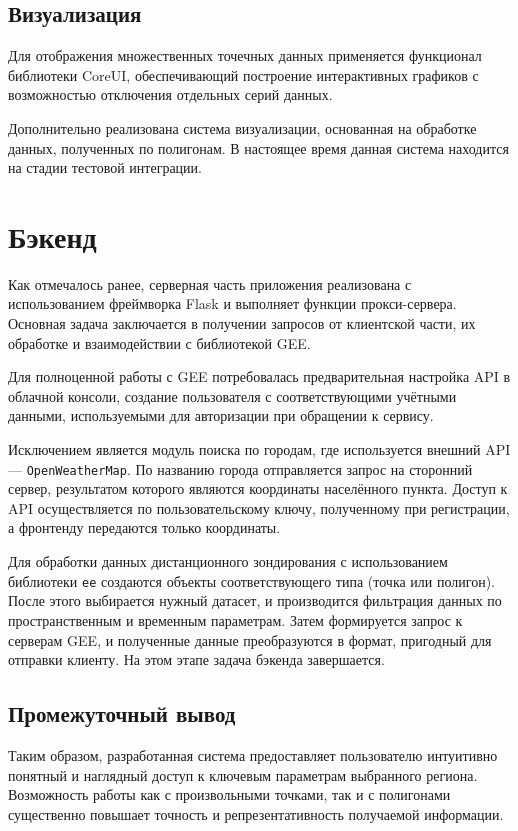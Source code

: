 \subsection*{Визуализация}

Для отображения множественных точечных данных применяется функционал библиотеки CoreUI, обеспечивающий построение интерактивных графиков с возможностью отключения отдельных серий данных.

Дополнительно реализована система визуализации, основанная на обработке данных, полученных по полигонам. В настоящее время данная система находится на стадии тестовой интеграции.

\section{Бэкенд}

Как отмечалось ранее, серверная часть приложения реализована с использованием фреймворка Flask и выполняет функции прокси-сервера. Основная задача заключается в получении запросов от клиентской части, их обработке и взаимодействии с библиотекой GEE\cite{GoogleEarthEngine2023}.

Для полноценной работы с GEE потребовалась предварительная настройка API в облачной консоли, создание пользователя с соответствующими учётными данными, используемыми для авторизации при обращении к сервису.

Исключением является модуль поиска по городам, где используется внешний API — \texttt{OpenWeatherMap}. По названию города отправляется запрос на сторонний сервер, результатом которого являются координаты населённого пункта. Доступ к API осуществляется по пользовательскому ключу, полученному при регистрации, а фронтенду передаются только координаты.

Для обработки данных дистанционного зондирования с использованием библиотеки \texttt{ee} создаются объекты соответствующего типа (точка или полигон). После этого выбирается нужный датасет, и производится фильтрация данных по пространственным и временным параметрам. Затем формируется запрос к серверам GEE, и полученные данные преобразуются в формат, пригодный для отправки клиенту. На этом этапе задача бэкенда завершается.

\subsection*{Промежуточный вывод}

Таким образом, разработанная система предоставляет пользователю интуитивно понятный и наглядный доступ к ключевым параметрам выбранного региона. Возможность работы как с произвольными точками, так и с полигонами существенно повышает точность и репрезентативность получаемой информации.
